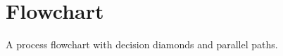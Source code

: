 \documentclass[
    language=english,
    doctype=article,
    institution=none,
    titlestyle=book,
]{../../omnilatex}
\begin{document}
\maketitle

\begin{abstract}
This gallery showcases 22 distinct TikZ and pgfplots diagram types commonly used
in scientific publications, technical documentation, and presentations. Each example
is self-contained with annotations explaining key techniques.
\end{abstract}

\tableofcontents

\section{Flowchart}
\label{sec:flowchart}

A process flowchart with decision diamonds and parallel paths.
\end{document}

